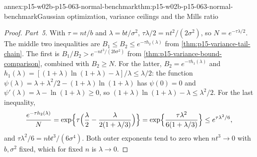 \begin{annexitem}{annex:p15-w02b-p15-063-normal-benchmark}{thm:p15-w02b-p15-063-normal-benchmark}{Gaussian optimization, variance ceilings and the Mills ratio}
\begin{proof}
\emph{Part~5.} With \(\tau=nt/b\) and \(\lambda=bt/\sigma^2\),
\(\tau\lambda/2=nt^2/(2\sigma^2)\), so \(N=e^{-\tau\lambda/2}\). The middle
two inequalities are \(B_1\leq B_2\leq e^{-\tau h_2(\lambda)}\) from
\cref{thm:p15-variance-tail-chain}. The first is
\(B_1/B_2>e^{-nt^3/(2b\sigma^2)}\) from
\cref{thm:p15-variance-bound-comparison}, combined with \(B_2\geq N\).
For the latter, \(B_2=e^{-\tau h_1(\lambda)}\) and
\(h_1(\lambda)=[(1+\lambda)\ln(1+\lambda)-\lambda]/\lambda\leq\lambda/2\):
the function \(\psi(\lambda)=\lambda+\lambda^2/2-(1+\lambda)\ln(1+\lambda)\)
has \(\psi(0)=0\) and \(\psi'(\lambda)=\lambda-\ln(1+\lambda)\geq0\), so
\((1+\lambda)\ln(1+\lambda)-\lambda\leq\lambda^2/2\). For the last
inequality,
\[
 \frac{e^{-\tau h_2(\lambda)}}N
   =\exp\Bigl\{\tau\Bigl(\frac\lambda2-\frac{\lambda}{2(1+\lambda/3)}\Bigr)\Bigr\}
   =\exp\Bigl\{\frac{\tau\lambda^2}{6(1+\lambda/3)}\Bigr\}
   \leq e^{\tau\lambda^2/6},
\]
and \(\tau\lambda^2/6=nbt^3/(6\sigma^4)\). Both outer exponents tend to
zero when \(nt^3\to0\) with \(b,\sigma^2\) fixed, which for fixed \(n\) is
\(\lambda\to0\).
\end{proof}
\end{annexitem}

